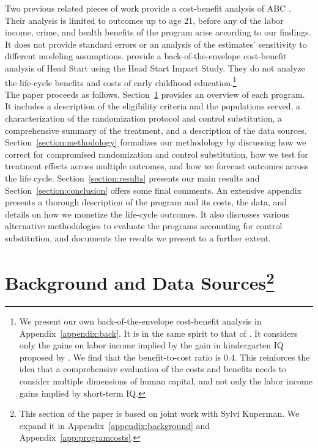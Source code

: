 \noindent Two previous related pieces of work provide a cost-benefit analysis of ABC \citep{Masse_Barnett_2002_BOOKBenefitCostAnalysis,Barnett_Masse_2007_EER}. Their analysis is limited to outcomes up to age 21, before any of the labor income, crime, and health benefits of the program arise according to our findings. It does not provide standard errors or an analysis of the estimates' sensitivity to different modeling assumptions. \citet{Kline-Walters_2015_NBER-Evaluating} provide a back-of-the-envelope cost-benefit analysis of Head Start using the Head Start Impact Study. They do not analyze the life-cycle benefits and costs of early childhood education.\footnote{We present our own back-of-the-envelope cost-benefit analysis in Appendix~\ref{appendix:back}. It is in the same spirit to that of \citet{
Kline-Walters_2015_NBER-Evaluating}. It considers only the gains on labor income implied by the gain in kindergarten IQ proposed by \citet{
Chetty_Friedman_etal_2011_QJoE}. We find that the benefit-to-cost ratio is $0.4$. This reinforces the idea that a comprehensive evaluation of the costs and benefits needs to consider multiple dimensions of human capital, and not only the labor income gains implied by short-term IQ.} \\ 

\noindent The paper proceeds as follows. Section~\ref{section:background}  provides an overview of each program. It includes a description of the eligibility criteria and the populations served, a characterization of the randomization protocol and control substitution, a comprehensive summary of the treatment, and a description of the data sources. Section~\ref{section:methodology} formalizes our methodology by discussing how we correct for compromised randomization and control substitution, how we test for treatment effects across multiple outcomes, and how we forecast outcomes across the life cycle. Section~\ref{section:results} presents our main results and Section~\ref{section:conclusion} offers some final comments. An extensive appendix presents a thorough description of the program and its costs, the data, and details on how we monetize the life-cycle outcomes. It also discusses various alternative methodologies to evaluate the programs accounting for control substitution, and documents the results we present to a further extent.

\section[Background and Data Sources]{Background and Data Sources\footnote{This section of the paper is based on joint work with Sylvi Kuperman. We expand it  in Appendix~\ref{appendix:background} and Appendix~\ref{app:programcosts}.}} \label{section:background}

